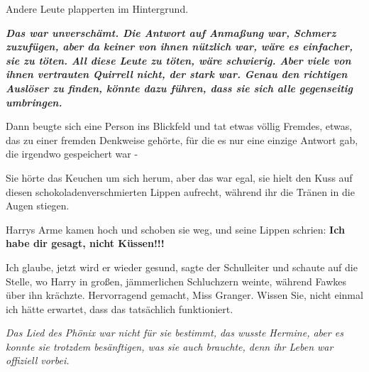 Andere Leute plapperten im Hintergrund.

\textbf{\emph{Das war unverschämt. Die Antwort auf Anmaßung war, Schmerz
zuzufügen, aber da keiner von ihnen nützlich war, wäre es einfacher, sie zu
töten. All diese Leute zu töten, wäre schwierig. Aber viele von ihnen vertrauten
Quirrell nicht, der stark war. Genau den richtigen Auslöser zu finden, könnte
dazu führen, dass sie sich alle gegenseitig umbringen.}}

Dann beugte sich eine Person ins Blickfeld und tat etwas völlig Fremdes, etwas,
das zu einer fremden Denkweise gehörte, für die es nur eine einzige Antwort gab,
die irgendwo gespeichert war -

Sie hörte das Keuchen um sich herum, aber das war egal, sie hielt den Kuss auf
diesen schokoladenverschmierten Lippen aufrecht, während ihr die Tränen in die
Augen stiegen.

Harrys Arme kamen hoch und schoben sie weg, und seine Lippen schrien: \textbf{
\glqq{}Ich habe dir gesagt, nicht Küssen!!!\grqq{}}

\glqq{}Ich glaube, jetzt wird er wieder gesund\grqq{}, sagte der Schulleiter und
schaute auf die Stelle, wo Harry in großen, jämmerlichen Schluchzern weinte,
während Fawkes über ihn krächzte. \glqq{}Hervorragend gemacht, Miss Granger.
Wissen Sie, nicht einmal ich hätte erwartet, dass das tatsächlich funktioniert.\grqq{}

\emph{Das Lied des Phönix war nicht für sie bestimmt, das wusste Hermine, aber
es konnte sie trotzdem besänftigen, was sie auch brauchte, denn ihr Leben war
offiziell vorbei.}

